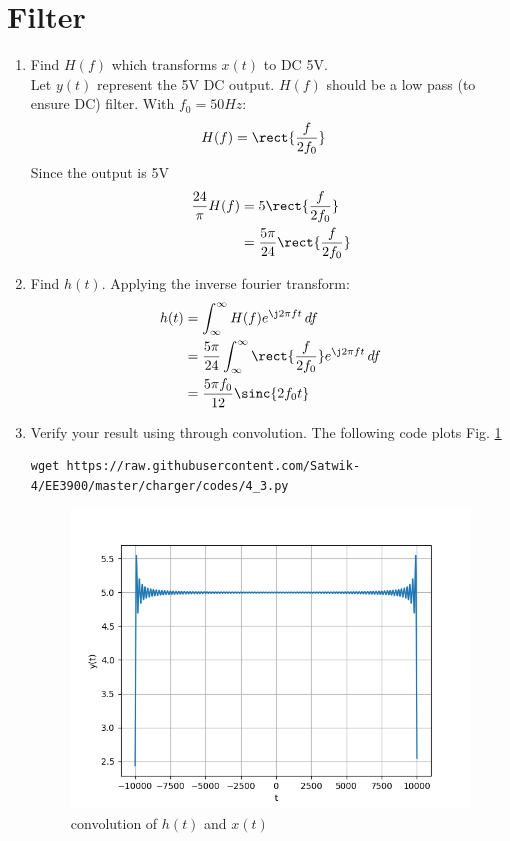 \documentclass[journal,12pt,twocolumn]{IEEEtran}
\renewcommand\thesection{\arabic{section}}
\begin{document}
\section{Filter}
\begin{enumerate}[label=\thesection.\arabic*
,ref=\thesection.\theenumi]
\item Find $H(f)$ which transforms $x(t)$ to DC 5V.\\\solution Let $y(t)$ represent the 5V DC output. $H(f)$ should be a low pass (to ensure DC) filter. With $f_0 = 50Hz$:
\begin{align}
    H(f) &= \rect{\frac{f}{2f_0}}
\end{align}
Since the output is 5V
\begin{align}
    \frac{24}{\pi}H(f) &= 5\rect{\frac{f}{2f_0}}\\
    &= \frac{5\pi}{24}\rect{\frac{f}{2f_0}}
\end{align}
\item Find $h(t)$.
Applying the inverse fourier transform:
\begin{align}
    h(t) &= \int_\infty^\infty H(f)e^{\j2\pi ft}\,df\\
    &= \frac{5\pi}{24}\int_\infty^\infty \rect{\frac{f}{2f_0}}e^{\j2\pi ft}\,df\\
    &= \frac{5\pi f_0}{12}\sinc{2f_0t}
\end{align}
\item Verify your result using  through convolution.
  The following code plots Fig. \ref{fig:conv-ft}
	\begin{lstlisting}
wget https://raw.githubusercontent.com/Satwik-4/EE3900/master/charger/codes/4_3.py
\end{lstlisting}
	\begin{figure}[h!]
	    \centering
	    \includegraphics[width=\columnwidth]{figures/conv-hx.png}
	    \caption{convolution of $h(t)$ and $x(t)$ }
	    \label{fig:conv-ft}
	\end{figure}

\end{enumerate}
\end{document}
